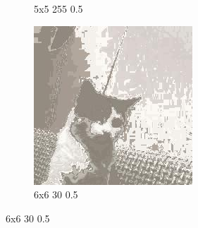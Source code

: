 \documentclass[12pt,a4paper]{article}
\begin{document}
\begin{figure}[htb]
\begin{subfigure}{0.25\textwidth}
  \caption{5x5 255 0.5}
  \label{fig:5}
\end{subfigure}
\begin{subfigure}{0.25\textwidth}
  \includegraphics[width=\linewidth]{images/small/6-6-30-05}
  \caption{6x6 30 0.5}
  \label{fig:6}
\end{subfigure}\hfil %


\end{figure}
\end{document}
